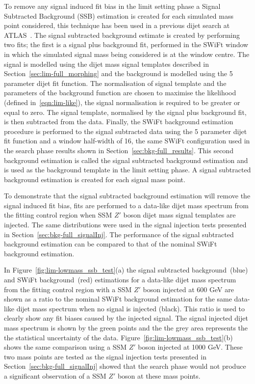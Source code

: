 To remove any signal induced fit bias in the limit setting phase a Signal Subtracted Background (SSB) estimation is
created for each simulated mass point considered, this technique has been used in a previous dijet search at ATLAS~\cite{dijet-mori17_paper}.
The signal subtracted background estimate is created by performing two fits;
the first is a signal plus background fit, performed in the SWiFt window
in which the simulated signal mass being considered is at the window centre.
The signal is modelled using the dijet mass signal templates described in Section~\ref{sec:lim-full_morphing}
and the background is modelled using the 5 parameter dijet fit function.
The normalisation of signal template and the parameters of the background function are
chosen to maximise the likelihood (defined in~\ref{eqn:lim-like}),
the signal normalisation is required to be greater or equal to zero.
The signal template, normalised by the signal plus background fit, is then subtracted from the data.
Finally, the SWiFt background estimation procedure is performed to the signal subtracted data using the 
5 parameter dijet fit function and a window half-width of 16, the same SWiFt configuration used in the search phase results shown in Section~\ref{sec:bkg-full_results}.
This second background estimation is called the signal subtracted background estimation and is used as the background template in the limit setting phase.
A signal subtracted background estimation is created for each signal mass point.

To demonstrate that the signal subtracted background estimation will remove the signal induced fit bias,
fits are performed to a data-like dijet mass spectrum from the fitting control region when SSM $Z'$ boson dijet mass signal templates are injected.
The same distributions were used in the signal injection tests presented in Section~\ref{sec:bkg-full_signalInj}.
The performance of the signal subtracted background estimation can be compared to that of the nominal SWiFt background estimation.

In Figure~\ref{fig:lim-lowmass_ssb_test}(a) the signal subtracted background~(blue) and SWiFt background~(red) estimations
for a data-like dijet mass spectrum from the fitting control region with a SSM $Z'$ boson injected at 600 GeV are
shown as a ratio to the nominal SWiFt background estimation for the same data-like dijet mass spectrum when no signal is injected (black).
This ratio is used to clearly show any fit biases caused by the injected signal.
The signal injected dijet mass spectrum is shown by the green points and the the grey area represents the the statistical uncertainty of the data.
Figure~\ref{fig:lim-lowmass_ssb_test}(b) shows the same comparison using a SSM $Z'$ boson injected at 1000 GeV.
These two mass points are tested as the signal injection tests presented in Section~\ref{sec:bkg-full_signalInj} showed that the search phase
would not produce a significant observation of a SSM $Z'$ boson at these mass points. 

